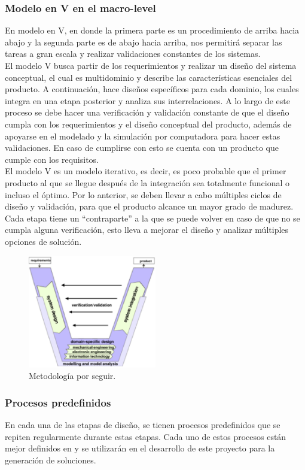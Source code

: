 \subsubsection{Modelo en V en el macro-level}
En modelo en V, en donde la primera parte es un procedimiento de arriba hacia abajo y la segunda parte es de abajo hacia arriba, nos permitirá separar las tareas a gran escala y realizar validaciones constantes de los sistemas.\\
El modelo V busca partir de los requerimientos y realizar un diseño del sistema conceptual, el cual es multidominio y describe las características esenciales del producto. A continuación, hace diseños específicos para cada dominio, los cuales integra en una etapa posterior y analiza sus interrelaciones. A lo largo de este proceso se debe hacer una verificación y validación constante de que el diseño cumpla con los requerimientos y el diseño conceptual del producto, además de apoyarse en el modelado y la simulación por computadora para hacer estas validaciones. En caso de cumplirse con esto se cuenta con un producto que cumple con los requisitos.\\
El modelo V es un modelo iterativo, es decir, es poco probable que el primer producto al que se llegue después de la integración sea totalmente funcional o incluso el óptimo. Por lo anterior, se deben llevar a cabo múltiples ciclos de diseño y validación, para que el producto alcance un mayor grado de madurez. Cada etapa tiene un “contraparte” a la que se puede volver en caso de que no se cumpla alguna verificación, esto lleva a mejorar el diseño y analizar múltiples opciones de solución.
\begin{figure}[!htb]
    \centering
    \includegraphics[width=0.5\textwidth]{imagenes/4.jpg}
    \caption{\footnotesize Metodología por seguir.}
    \label{Fig:MetodologiaV}
\end{figure}
\FloatBarrier

\subsubsection{Procesos predefinidos}
En cada una de las etapas de diseño, se tienen procesos predefinidos que se repiten regularmente durante estas etapas. Cada uno de estos procesos están mejor definidos en \cite{Pahl1996} y se utilizarán en el desarrollo de este proyecto para la generación de soluciones.